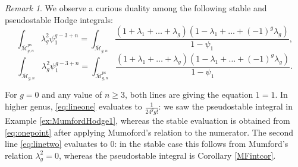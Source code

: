 \documentclass[leqno,12pt]{amsart}
\theoremstyle{remark}
\newtheorem{remark}[theorem]{Remark}
\numberwithin{equation}{section}
\DeclareMathOperator{\ps}{ps}
\begin{document}
\begin{remark}
We observe a curious duality among the following stable and pseudostable Hodge integrals:
    \begin{equation}\label{eq:lineone}
    \int_{\overline{\mathcal{M}}^{\ps}_{g, n}} \lambda_g^2\psi_1^{g-3+n} =  \int_{\overline{\mathcal{M}}_{g, n}}\frac{(1 + \lambda_1 + \dots + \lambda_g)(1 - \lambda_1 + \dots + (-1)^g\lambda_g)}{1-\psi_1},
    \end{equation}
    \begin{equation}\label{eq:linetwo}
    \int_{\overline{\mathcal{M}}_{g, n}} \lambda_g^2\psi_1^{g-3+n} =   \int_{\overline{\mathcal{M}}^{\ps}_{g, n}}\frac{(1 + \lambda_1 + \dots + \lambda_g)(1 - \lambda_1 + \dots + (-1)^g\lambda_g)}{1-\psi_1}.
    \end{equation}

For $g = 0$ and any value of $n\geq 3$, both lines are giving the  equation $1 = 1$. In higher genus,  \eqref{eq:lineone} evaluates to $\frac{1}{24^gg!}$: we saw the pseudostable integral in Example \ref{ex:MumfordHodge1}, whereas the stable evaluation is obtained from \eqref{eq:onepoint} after applying Mumoford's relation to the numerator. The second line \eqref{eq:linetwo} evaluates to $0$: in the stable case this follows from Mumford's relation $\lambda_g^2 = 0$, whereas the pseudostable integral is Corollary \ref{MFintcor}.

\end{remark}
\end{document}
